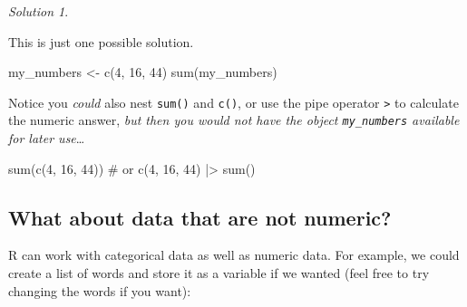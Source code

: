 \documentclass[
  letterpaper,
  DIV=11,
  numbers=noendperiod]{scrreprt}
\newenvironment{Shaded}{\begin{snugshade}}{\end{snugshade}}
\newcommand{\CommentTok}[1]{\textcolor[rgb]{0.37,0.37,0.37}{#1}}
\newcommand{\DecValTok}[1]{\textcolor[rgb]{0.68,0.00,0.00}{#1}}
\newcommand{\FunctionTok}[1]{\textcolor[rgb]{0.28,0.35,0.67}{#1}}
\newcommand{\NormalTok}[1]{\textcolor[rgb]{0.00,0.23,0.31}{#1}}
\newcommand{\OtherTok}[1]{\textcolor[rgb]{0.00,0.23,0.31}{#1}}
\newcommand{\SpecialCharTok}[1]{\textcolor[rgb]{0.37,0.37,0.37}{#1}}
\theoremstyle{remark}
\newtheorem*{solution}{Solution}
\begin{document}
\begin{solution}
\leavevmode

\begin{tcolorbox}[enhanced jigsaw, colbacktitle=quarto-callout-note-color!10!white, opacitybacktitle=0.6, titlerule=0mm, left=2mm, leftrule=.75mm, toptitle=1mm, toprule=.15mm, rightrule=.15mm, title=\textcolor{quarto-callout-note-color}{\faInfo}\hspace{0.5em}{Solution}, colback=white, arc=.35mm, colframe=quarto-callout-note-color-frame, bottomrule=.15mm, breakable, bottomtitle=1mm, opacityback=0, coltitle=black]

This is just one possible solution.

\begin{Shaded}
\begin{Highlighting}[]
\NormalTok{my\_numbers }\OtherTok{\textless{}{-}} \FunctionTok{c}\NormalTok{(}\DecValTok{4}\NormalTok{, }\DecValTok{16}\NormalTok{, }\DecValTok{44}\NormalTok{)}
\FunctionTok{sum}\NormalTok{(my\_numbers)}
\end{Highlighting}
\end{Shaded}

Notice you \emph{could} also nest \texttt{sum()} and \texttt{c()}, or
use the pipe operator \texttt{\textbar{}\textgreater{}} to calculate the
numeric answer, \emph{but then you would not have the object
\texttt{my\_numbers} available for later use}\ldots{}

\begin{Shaded}
\begin{Highlighting}[]
\FunctionTok{sum}\NormalTok{(}\FunctionTok{c}\NormalTok{(}\DecValTok{4}\NormalTok{, }\DecValTok{16}\NormalTok{, }\DecValTok{44}\NormalTok{))}
\CommentTok{\# or }
\FunctionTok{c}\NormalTok{(}\DecValTok{4}\NormalTok{, }\DecValTok{16}\NormalTok{, }\DecValTok{44}\NormalTok{) }\SpecialCharTok{|\textgreater{}}
  \FunctionTok{sum}\NormalTok{()}
\end{Highlighting}
\end{Shaded}

\end{tcolorbox}

\end{solution}

\subsection{What about data that are not
numeric?}\label{what-about-data-that-are-not-numeric}

R can work with categorical data as well as numeric data. For example,
we could create a list of words and store it as a variable if we wanted
(feel free to try changing the words if you want):
\end{document}
